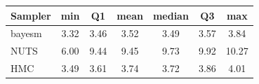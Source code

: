 \begin{tabular}{lcccccc}
\toprule
Sampler & min & Q1 & mean & median & Q3 & max \\
\midrule
bayesm & 3.32 & 3.46 & 3.52 & 3.49 & 3.57 & 3.84 \\
NUTS & 6.00 & 9.44 & 9.45 & 9.73 & 9.92 & 10.27 \\
HMC & 3.49 & 3.61 & 3.74 & 3.72 & 3.86 & 4.01 \\
\bottomrule
\end{tabular}
